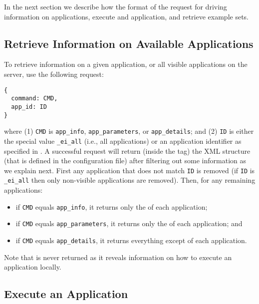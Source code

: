 \bigskip 
In the next section we describe how the format of the request for
driving information on applications, execute and application, and
retrieve example sets.

\subsection{Retrieve Information on Available Applications}

To retrieve information on a given application, or all visible
applications on the server, use the following request:

\bigskip
\begin{lstlisting}
{
  command: CMD,
  app_id: ID
}
\end{lstlisting}

\bigskip
\noindent
where (1) \texttt{CMD} is \texttt{app\_info},
\texttt{app\_parameters}, or \texttt{app\_details}; and (2)
\texttt{ID} is either the special value \texttt{\_ei\_all} (i.e., all
applications) or an application identifier as specified in
.
%
A successful request will return (inside the  tag) the
XML structure  (that is defined in the
configuration file) after filtering out some information as we explain
next.
%
First any application that does not match \texttt{ID} is removed (if
\texttt{ID} is \texttt{\_ei\_all} then only non-visible applications
are removed). Then, for any remaining applications:
%
\begin{itemize}
%
\item if \texttt{CMD} equals \texttt{app\_info}, it returns only the
   of each application;
%
\item if \texttt{CMD} equals \texttt{app\_parameters}, it returns only the
   of each application; and
%
\item if \texttt{CMD} equals \texttt{app\_details}, it returns
  everything except  of each
  application.
%
\end{itemize}
%
Note that  is never returned as it
reveals information on how to execute an application locally.



\subsection{Execute an Application}

